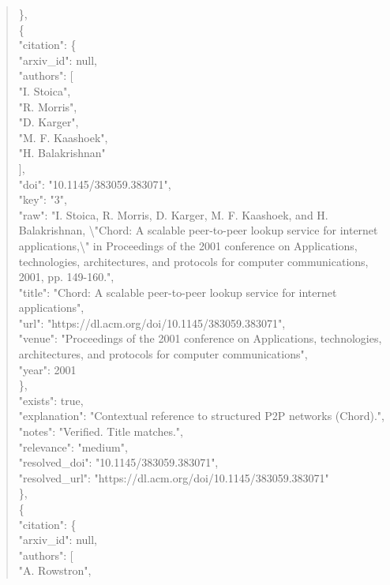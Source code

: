 \documentclass[11pt]{article}
\begin{document}
\begin{quote}
    \},\\
    \{\\
      "citation": \{\\
        "arxiv\_id": null,\\
        "authors": [\\
          "I. Stoica",\\
          "R. Morris",\\
          "D. Karger",\\
          "M. F. Kaashoek",\\
          "H. Balakrishnan"\\
        ],\\
        "doi": "10.1145/383059.383071",\\
        "key": "3",\\
        "raw": "I. Stoica, R. Morris, D. Karger, M. F. Kaashoek, and H. Balakrishnan, \textbackslash{}"Chord: A scalable peer-to-peer lookup service for internet applications,\textbackslash{}" in Proceedings of the 2001 conference on Applications, technologies, architectures, and protocols for computer communications, 2001, pp. 149-160.",\\
        "title": "Chord: A scalable peer-to-peer lookup service for internet applications",\\
        "url": "https://dl.acm.org/doi/10.1145/383059.383071",\\
        "venue": "Proceedings of the 2001 conference on Applications, technologies, architectures, and protocols for computer communications",\\
        "year": 2001\\
      \},\\
      "exists": true,\\
      "explanation": "Contextual reference to structured P2P networks (Chord).",\\
      "notes": "Verified. Title matches.",\\
      "relevance": "medium",\\
      "resolved\_doi": "10.1145/383059.383071",\\
      "resolved\_url": "https://dl.acm.org/doi/10.1145/383059.383071"\\
    \},\\
    \{\\
      "citation": \{\\
        "arxiv\_id": null,\\
        "authors": [\\
          "A. Rowstron",\\

\end{quote}
\end{document}
